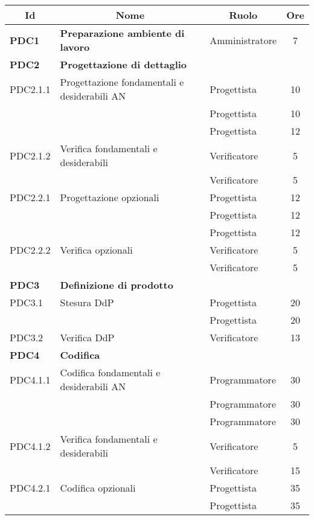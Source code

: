 \begin{table}[H]
	\centering
	\begin{tabular}{ l l l c  }
	\hline
	\multicolumn{1}{c}{\textbf{Id}} & 
	\multicolumn{1}{c}{\textbf{Nome}} & 
	\multicolumn{1}{c}{\textbf{Ruolo}}& 
	\multicolumn{1}{c}{\textbf{Ore}} \\
	\hline
	
	\textbf{PDC1} & \textbf{Preparazione ambiente di lavoro} & Amministratore & 7\\

	\hline
	\textbf{PDC2} & \textbf{Progettazione di dettaglio} \\
	\cline{3-4}
	PDC2.1.1 & Progettazione fondamentali e desiderabili AN & Progettista & 10\\ 
    & & Progettista & 10\\
    & & Progettista & 12\\
    \cline{3-4}
	PDC2.1.2 & Verifica fondamentali e desiderabili & Verificatore & 5\\
	& & Verificatore & 5\\
	\cline{3-4}
	PDC2.2.1 & Progettazione opzionali & Progettista & 12\\ 
    & & Progettista & 12\\
    & & Progettista & 12\\
	\cline{3-4}
	PDC2.2.2 & Verifica opzionali & Verificatore & 5\\	
	& & Verificatore & 5\\
	\hline
	\textbf{PDC3} & \textbf{Definizione di prodotto} \\
	\cline{3-4}
	PDC3.1 & Stesura DdP & Progettista & 20\\ 
	 & & Progettista & 20\\
    \cline{3-4}
	PDC3.2 & Verifica DdP & Verificatore &  13\\
	\hline
	\textbf{PDC4} & \textbf{Codifica} \\
	\cline{3-4}
	PDC4.1.1 & Codifica fondamentali e desiderabili AN & Programmatore & 30\\ 
    & & Programmatore & 30\\
    & & Programmatore & 30\\
    \cline{3-4}
	PDC4.1.2 & Verifica fondamentali e desiderabili & Verificatore & 5\\
	& & Verificatore & 15\\
	\cline{3-4}
	PDC4.2.1 & Codifica opzionali & Progettista & 35\\ 
    & & Progettista & 35\\

\end{tabular}
\end{table}
